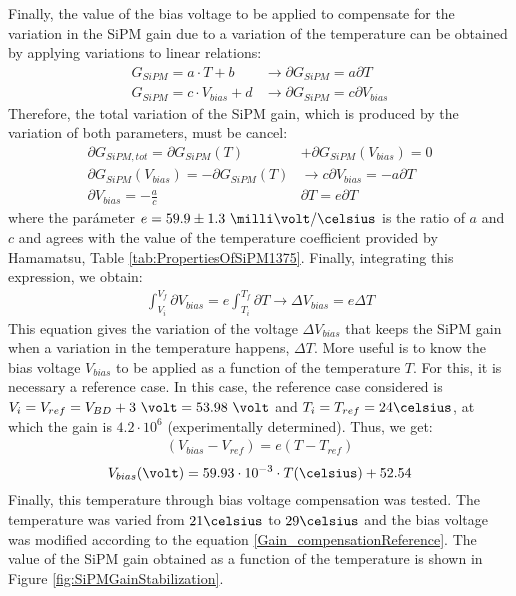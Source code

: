 Finally, the value of the bias voltage to be applied to compensate for the variation in the SiPM gain due to a variation of the temperature can be obtained by applying variations to linear relations:
\begin{equation*}
\begin{split}
G_{SiPM}=a \cdot{} T + b  &\longrightarrow \partial G_{SiPM}= a \partial T\\
G_{SiPM}=c \cdot{} V_{bias} + d &\longrightarrow \partial G_{SiPM}= c \partial V_{bias}
\label{Gain_compensationVariations}
\end{split}
\end{equation*} 
Therefore, the total variation of the SiPM gain, which is produced by the variation of both parameters, must be cancel:
\begin{equation*}
\begin{split}
\partial G_{SiPM, tot}= \partial G_{SiPM}(T) &+ \partial G_{SiPM}(V_{bias}) = 0\\ 
\partial G_{SiPM}(V_{bias}) = -\partial G_{SiPM}(T) &\longrightarrow c \partial V_{bias} = - a \partial T\\ 
\partial V_{bias}  = - \frac{a}{c}&\partial T = e \partial T
\label{Gain_compensation0}
\end{split}
\end{equation*} 
where the parámeter $e= 59.9 \pm 1.3~\milli\volt/\celsius $ is the ratio of $a$ and $c$ and agrees with the value of the temperature coefficient provided by Hamamatsu, Table \ref{tab:PropertiesOfSiPM1375}. Finally, integrating this expression, we obtain:
\begin{equation}
\begin{split}
\int_{V_i}^{V_f}\partial V_{bias}  = e\int_{T_i}^{T_f}\partial T \longrightarrow \Delta V_{bias} = e \Delta T
\label{Gain_compensationIntegring}
\end{split}
\end{equation} 
This equation gives the variation of the voltage $\Delta V_{bias}$ that keeps the SiPM gain when a variation in the temperature happens, $\Delta T$. More useful is to know the bias voltage $V_{bias}$ to be applied as a function of the temperature $T$. For this, it is necessary a reference case. In this case, the reference case considered is $V_i=V_{ref}= V_{BD}+3~\volt = 53.98~\volt$ and $T_i=T_{ref}=24\celsius$, at which the gain is $4.2 \cdot{} 10^{6}$ (experimentally determined). Thus, we get:
\begin{equation*}
\begin{split}
(V_{bias}-V_{ref} )= e \left( T -T_{ref} \right) 
\label{Gain_compensationEquation}
\end{split}
\end{equation*}
\begin{equation}
V_{bias}(\volt)= 59.93 \cdot{} 10^{-3} \cdot{} T(\celsius) + 52.54
\label{Gain_compensationReference}
\end{equation}  
Finally, this temperature through bias voltage compensation was tested. The temperature was varied from $21\celsius$ to $29\celsius$ and the bias voltage was modified according to the equation \ref{Gain_compensationReference}. The value of the SiPM gain obtained as a function of the temperature is shown in Figure \ref{fig:SiPMGainStabilization}.

